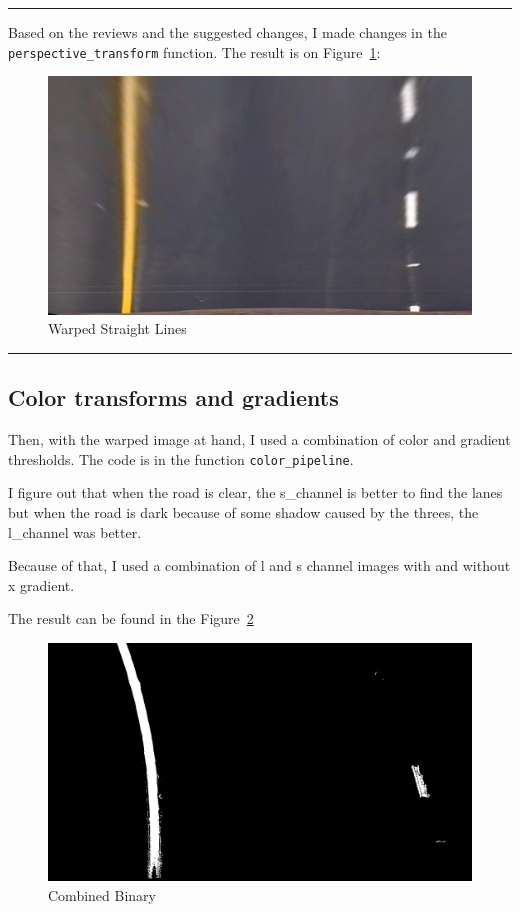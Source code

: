 \documentclass[11pt, a4paper]{article}
\begin{document}
\noindent\rule{12.5cm}{0.5pt}

Based on the reviews and the suggested changes, I made changes in the \texttt{perspective\_transform} function. The result is on Figure~\ref{fig:warpedstraightlines}:


\begin{figure}[htb!]
	\centering
	\includegraphics[width=0.8\linewidth]{warped_straightlines}
	\caption{Warped Straight Lines}
	\label{fig:warpedstraightlines}
\end{figure}




\noindent\rule{12.5cm}{0.5pt}




\subsection{Color transforms and gradients}%
\label{sub:color_transforms_and_gradients}


Then, with the warped image at hand, I used a combination of color and gradient thresholds. The code is in the function \texttt{color\_pipeline}.


I figure out that when the road is clear, the s\_channel is better to find the lanes but when the road is dark because of some shadow caused by the threes, the l\_channel was better. 

Because of that, I used a combination of l and s channel images with and without x gradient.

The result can be found in the Figure~\ref{fig:combined_binary}



\begin{figure}[htb!]
	\centering
	\includegraphics[width=0.8\linewidth]{combined_binary}
	\caption{Combined Binary}
	\label{fig:combined_binary}
\end{figure}
\end{document}
